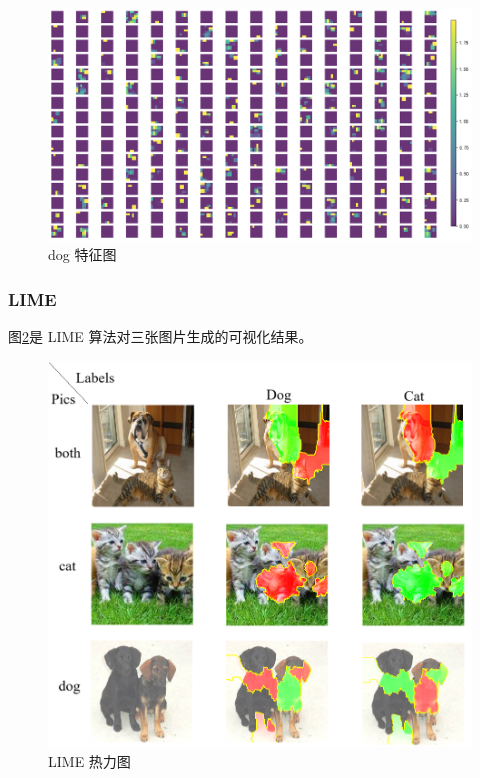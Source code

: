 \documentclass[supercite]{Experimental_Report}
\theoremstyle{definition}
\begin{document}
\begin{figure}[H]
	\begin{center}
		\includegraphics[scale=0.35]{../images/feature-map2.png}
		\caption{dog 特征图}
		\label{特征图3}
	\end{center}
\end{figure}

\subsubsection{LIME}
图\ref{LIME热力图}是 LIME 算法对三张图片生成的可视化结果。
\begin{figure}[H]
	\begin{center}
		\includegraphics[scale=0.4]{../images/LIME热力图.png}
		\caption{LIME 热力图}
		\label{LIME热力图}
	\end{center}
\end{figure}
\end{document}
